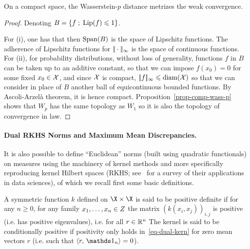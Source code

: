 \begin{cor}\label{cor-topol-wass}
	On a compact space, the Wasserstein-$p$ distance metrizes the weak convergence. 
\end{cor}
\begin{proof}
	Denoting $B=\left\{ f \;;\; \text{Lip}(f) \leqslant 1 \right\}$.
	
	For (i), one has that then $\operatorname{Span}(B)$ is the space of Lipschitz functions.
	The adherence of Lipschitz functions for $|\!| \cdot |\!|_\infty$ is the space of continuous functions.
	For (ii), for probability distributions, without loss of generality, functions $f$ in $B$ can be taken up to an additive constant, so that we can impose $f(x_0)=0$ for some fixed $x_0 \in \mathcal{X}$, and since $\mathcal{X}$ is compact, $|\!| f |\!|_\infty \leqslant \text{diam}(\mathcal{X})$ so that we can consider in place of $B$ another ball of equicontinuous bounded functions. By Ascoli-Arzel\`a theorem, it is hence compact. 	
	Proposition~\ref{prop-comp-wass-p} shows that $W_p$ has the same topology as $W_1$ so it is also the topology of convergence in law. 
\end{proof}





\paragraph{Dual RKHS Norms and Maximum Mean Discrepancies.}

It is also possible to define ``Euclidean'' norms (built using quadratic functionals) on measures using the machinery of kernel methods and more specifically reproducing kernel Hilbert spaces (RKHS; see~\cite{scholkopf2002learning} for a survey of their applications in data sciences), of which we recall first some basic definitions.

\begin{defn}\label{def-negativedefinitekernel}
A symmetric function $k$ defined on $\X \times \X$ is said to be positive definite if for any $n\geq0$, for any family $x_1,\dots,x_n\in Z$ the matrix $(k(x_i,x_j))_{i,j}$ is positive (i.e. has positive eigenvalues), i.e.  for all $r \in \mathbb{R}^n$
The kernel is said to be conditionally positive if positivity only holds in~\eqref{eq-dual-kern} for zero mean vectors $r$ (i.e. such that $\dotp{r}{\ones_n}=0$).  
\end{defn}

